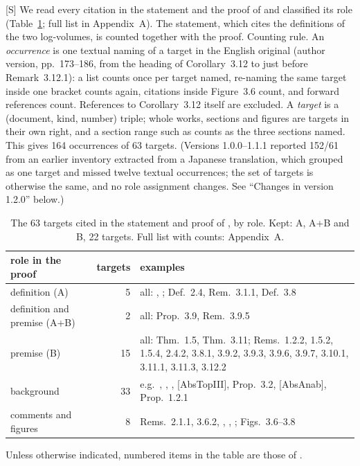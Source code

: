 \documentclass[11pt]{article}
\theoremstyle{plain}
\theoremstyle{definition}
\theoremstyle{remark}
\newcommand{\Smark}{\textup{[S]}}
\begin{document}
\Smark{} We read every citation in the statement and the proof of \cite[Cor.~3.12]{IUT3}
and classified its role (Table~\ref{tab:inv}; full list in Appendix~A). The statement,
which cites the definitions of the two log-volumes, is counted together with the proof.
Counting rule. An \emph{occurrence} is one textual naming of a target in the English
original (author version, pp.~173--186, from the heading of Corollary~3.12 to just before
Remark~3.12.1): a list counts once per target named, re-naming the same target inside one
bracket counts again, citations inside Figure~3.6 count, and forward references count.
References to Corollary~3.12 itself are excluded. A \emph{target} is a (document, kind,
number) triple; whole works, sections and figures are targets in their own right, and a
section range such as \cite[\S\S 4, 5, 6]{IUT1} counts as the three sections named.
This gives 164 occurrences of 63 targets. (Versions 1.0.0--1.1.1 reported 152/61 from an
earlier inventory extracted from a Japanese translation, which grouped
\cite[\S\S 4, 5, 6]{IUT1} as one target and missed twelve textual occurrences; the set
of targets is otherwise the same, and no role assignment changes. See ``Changes in
version 1.2.0'' below.)
\begin{table}[!tbp]
\centering
\begin{tabular}{lrp{}}
\toprule
role in the proof & targets & examples\\
\midrule
definition (A) & 5 & all: \cite[Def.~3.1]{IUT1}, \cite[Cor.~4.10]{IUT2}; Def.~2.4, Rem.~3.1.1, Def.~3.8\\
definition and premise (A+B) & 2 & all: Prop.~3.9, Rem.~3.9.5\\
premise (B) & 15 & all: Thm.~1.5, Thm.~3.11; Rems.~1.2.2, 1.5.2, 1.5.4, 2.4.2,
3.8.1, 3.9.2, 3.9.3, 3.9.6, 3.9.7, 3.10.1, 3.11.1, 3.11.3, 3.12.2\\
background & 33 & e.g.\ \cite{EtTh}, \cite[\S 2, \S 3]{IUT2}, \cite[\S\S 4, 5, 6]{IUT1},
[AbsTopIII], Prop.~3.2, [AbsAnab], Prop.~1.2.1\\
comments and figures & 8 & Rems.~2.1.1, 3.6.2, \cite[Rem.~3.6.4]{IUT2}, \cite{IUT4},
\cite[Rem.~2.3.2]{IUT4}; Figs.~3.6--3.8\\
\bottomrule
\end{tabular}
\caption{The 63 targets cited in the statement and proof of
\cite[Cor.~3.12]{IUT3}, by role. Kept: A, A+B and B, 22 targets. Full list with counts:
Appendix~A.}\label{tab:inv}
\end{table}
Unless otherwise indicated, numbered items in the table are those of \cite{IUT3}.
\end{document}
